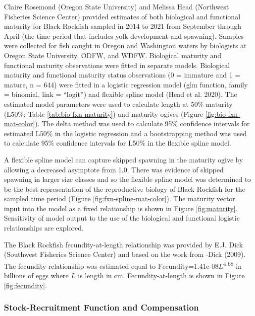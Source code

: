 \documentclass[11pt,
  letterpaper,
]{article}
\begin{document}
Claire Rosemond (Oregon State University) and Melissa Head (Northwest Fisheries Science Center) provided estimates of both biological and functional maturity for Black Rockfish sampled in 2014 to 2021 from September through April (the time period that includes yolk development and spawning). Samples were collected for fish caught in Oregon and Washington waters by biologists at Oregon State University, ODFW, and WDFW. Biological maturity and functional maturity observations were fitted in separate models. Biological maturity and functional maturity status observations (0 = immature and 1 = mature, n = 644) were fitted in a logistic regression model (glm function, family = binomial, link = ``logit'') and flexible spline model (Head et al. 2020). The estimated model parameters were used to calculate length at 50\% maturity (L50\%; Table \ref{tab:bio-fxn-maturity}) and maturity ogives (Figure \ref{fig:bio-fxn-mat-color}). The delta method was used to calculate 95\% confidence intervals for estimated L50\% in the logistic regression and a bootstrapping method was used to calculate 95\% confidence intervals for L50\% in the flexible spline model.

A flexible spline model can capture skipped spawning in the maturity ogive by allowing a decreased asymptote from 1.0. There was evidence of skipped spawning in larger size classes and so the flexible spline model was determined to be the best representation of the reproductive biology of Black Rockfish for the sampled time period (Figure \ref{fig:fxn-spline-mat-color}). The maturity vector input into the model as a fixed relationship is shown in Figure \ref{fig:maturity}. Sensitivity of model output to the use of the biological and functional logistic relationships are explored.

The Black Rockfish fecundity-at-length relationship was provided by E.J. Dick (Southwest Fisheries Science Center) and based on the work from -Dick (2009). The fecundity relationship was estimated equal to \(\text{Fecundity}\)=1.41e-08\(L\)\textsuperscript{4.68} in billions of eggs where \(L\) is length in cm. Fecundity-at-length is shown in Figure \ref{fig:fecundity}.

\hypertarget{stock-recruitment-function-and-compensation}{%
\subsubsection{Stock-Recruitment Function and Compensation}\label{stock-recruitment-function-and-compensation}}
\end{document}
